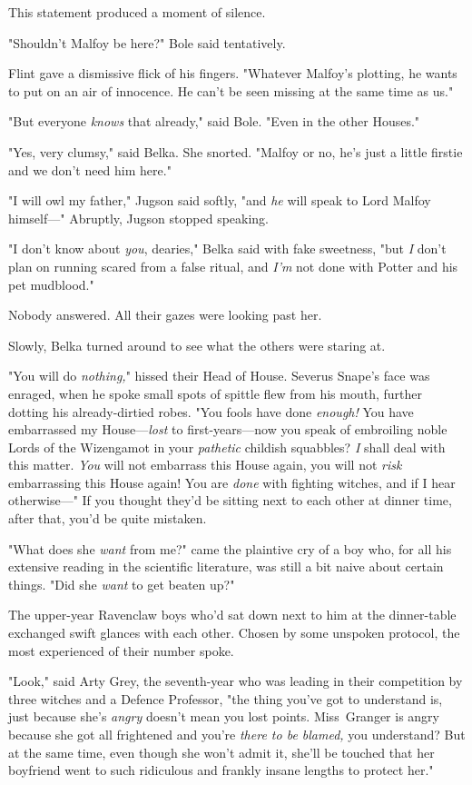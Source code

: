 This statement produced a moment of silence.

"Shouldn't Malfoy be here?" Bole said tentatively.

Flint gave a dismissive flick of his fingers. "Whatever Malfoy's plotting, he
wants to put on an air of innocence. He can't be seen missing at the same time
as us."

"But everyone \emph{knows} that already," said Bole. "Even in the other Houses."

"Yes, very clumsy," said Belka. She snorted. "Malfoy or no, he's just a little
firstie and we don't need him here."

"I will owl my father," Jugson said softly, "and \emph{he} will speak to Lord
Malfoy himself—" Abruptly, Jugson stopped speaking.

"I don't know about \emph{you}, dearies," Belka said with fake sweetness, "but
\emph{I} don't plan on running scared from a false ritual, and \emph{I'm} not
done with Potter and his pet mudblood."

Nobody answered. All their gazes were looking past her.

Slowly, Belka turned around to see what the others were staring at.

"You will do \emph{nothing,}" hissed their Head of House. Severus Snape's face
was enraged, when he spoke small spots of spittle flew from his mouth, further
dotting his already-dirtied robes. "You fools have done \emph{enough!} You have
embarrassed my House—\emph{lost} to first-years—now you speak of embroiling
noble Lords of the Wizengamot in your \emph{pathetic} childish squabbles?
\emph{I} shall deal with this matter. \emph{You} will not embarrass this House
again, you will not \emph{risk} embarrassing this House again! You are
\emph{done} with fighting witches, and if I hear otherwise—"
\later
If you thought they'd be sitting next to each other at dinner time, after that,
you'd be quite mistaken.

"What does she \emph{want} from me?" came the plaintive cry of a boy who, for
all his extensive reading in the scientific literature, was still a bit naive
about certain things. "Did she \emph{want} to get beaten up?"

The upper-year Ravenclaw boys who'd sat down next to him at the dinner-table
exchanged swift glances with each other. Chosen by some unspoken protocol, the
most experienced of their number spoke.

"Look," said Arty Grey, the seventh-year who was leading in their competition
by three witches and a Defence Professor, "the thing you've got to understand
is, just because she's \emph{angry} doesn't mean you lost points. Miss~Granger
is angry because she got all frightened and you're \emph{there to be blamed,}
you understand? But at the same time, even though she won't admit it, she'll be
touched that her boyfriend went to such ridiculous and frankly insane lengths
to protect her."


